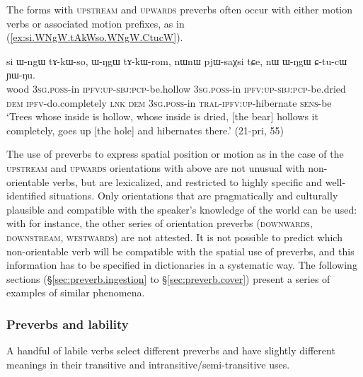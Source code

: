 
The forms with \textsc{upstream} and \textsc{upwards} preverbs often occur with either motion verbs or associated motion prefixes, as in (\ref{ex:si.WNgW.tAkWso.WNgW.CtucW}).

\begin{exe}
\ex \label{ex:si.WNgW.tAkWso.WNgW.CtucW}
\gll  si ɯ-ngɯ tɤ-kɯ-so, ɯ-ŋgɯ tɤ-kɯ-rom, nɯnɯ pjɯ-saχsi tɕe, nɯ ɯ-ŋgɯ ɕ-tu-cɯ ɲɯ-ŋu.\\
wood \textsc{3sg}.\textsc{poss}-in \textsc{ipfv}:\textsc{up}-\textsc{sbj}:\textsc{pcp}-be.hollow \textsc{3sg}.\textsc{poss}-in \textsc{ipfv}:\textsc{up}-\textsc{sbj}:\textsc{pcp}-be.dried \textsc{dem} \textsc{ipfv}-do.completely \textsc{lnk} \textsc{dem} \textsc{3sg}.\textsc{poss}-in \textsc{tral}-\textsc{ipfv}:\textsc{up}-hibernate \textsc{sens}-be \\
\glt `Trees whose inside is hollow, whose inside is dried, [the bear] hollows it completely, goes up [the hole] and hibernates there.' (21-pri, 55)
\end{exe}

The use of preverbs to express spatial position or motion as in the case of the \textsc{upstream} and \textsc{upwards} orientations with  above are not unusual with non-orientable verbs, but are lexicalized, and restricted to highly specific and well-identified situations. Only orientations that are pragmatically and culturally plausible and compatible with the speaker's knowledge of the world can be used: with  for instance, the other series of  orientation preverbs (\textsc{downwards}, \textsc{downstream}, \textsc{westwards}) are not attested. It is not possible to predict which non-orientable verb will be compatible with the spatial use of preverbs, and this information has to be specified in dictionaries in a systematic way. The following sections (§\ref{sec:preverb.ingestion} to §\ref{sec:preverb.cover}) present a series of examples of similar phenomena.

\subsubsection{Preverbs and lability} \label{sec:orientation.lability}
A handful of labile verbs select different preverbs and have slightly different meanings in their transitive and intransitive/semi-transitive uses.

